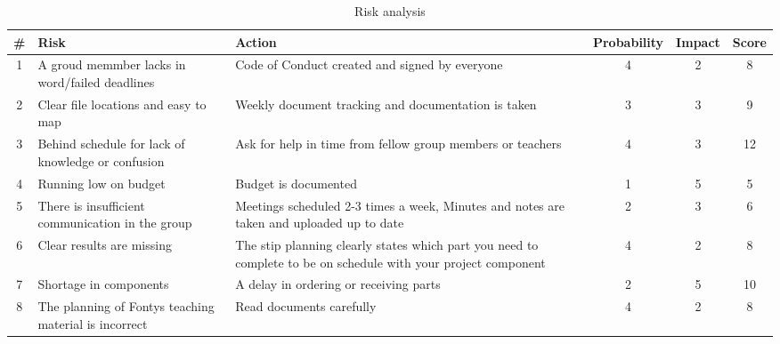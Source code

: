 \begin{table}[!h]
	\begin{tabularx}{\textwidth}{|c|X|X|c|c|c|} \hline
		\# 	& Risk 													& Action 																										& Probability 	& Impact 	& Score \\ \hline
		1 	& A groud memmber lacks in word/failed deadlines		& Code of Conduct created and signed by everyone																& 4				& 2			& 8		\\ \hline
		2 	& Clear file locations and easy to map					& Weekly document tracking and documentation is taken															& 3				& 3			& 9		\\ \hline
		3 	& Behind schedule for lack of knowledge or confusion	& Ask for help in time from fellow group members or teachers													& 4				& 3			& 12	\\ \hline
		4 	& Running low on budget									& Budget is documented																							& 1				& 5			& 5		\\ \hline
		5 	& There is insufficient communication in the group		& Meetings scheduled 2-3 times a week, Minutes and notes are taken and uploaded up to date						& 2				& 3			& 6		\\ \hline
		6 	& Clear results are missing								& The stip planning clearly states which part you need to complete to be on schedule with your project component& 4				& 2			& 8		\\ \hline
		7 	& Shortage in components								& A delay in ordering or receiving parts																		& 2				& 5			& 10	\\ \hline
		8 	& The planning of Fontys teaching material is incorrect	& Read documents carefully																						& 4				& 2			& 8		\\ \hline
	\end{tabularx}
	\caption{Risk analysis}
\end{table}